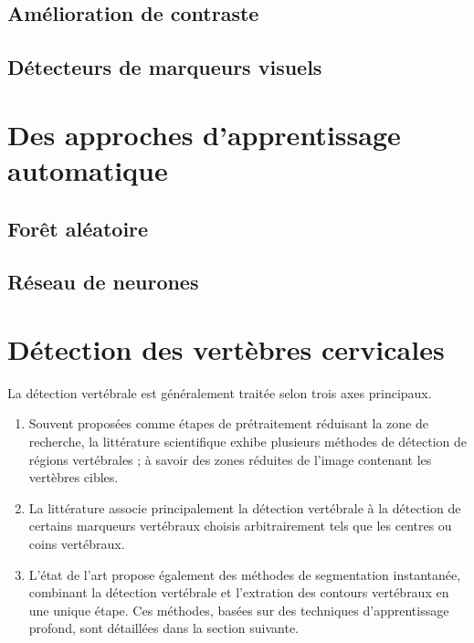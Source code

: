     \subsection{Amélioration de contraste}  %
    \subsection{Détecteurs de marqueurs visuels}
\section{Des approches d'apprentissage automatique}
    \subsection{Forêt aléatoire}
    \subsection{Réseau de neurones}









\section{Détection des vertèbres cervicales}

    La détection vertébrale est généralement traitée selon trois axes principaux.
    \begin{enumerate}
        \item Souvent proposées comme étapes de prétraitement réduisant la zone de recherche, la littérature scientifique exhibe plusieurs méthodes de détection de régions vertébrales ; à savoir des zones réduites de l'image contenant les vertèbres cibles.
        \item La littérature associe principalement la détection vertébrale à la détection de certains marqueurs vertébraux choisis arbitrairement tels que les centres ou coins vertébraux.
        \item L'état de l'art propose également des méthodes de segmentation instantanée, combinant la détection vertébrale et l'extration des contours vertébraux en une unique étape. Ces méthodes, basées sur des techniques d'apprentissage profond, sont détaillées dans la section suivante.
        \\
    \end{enumerate}


